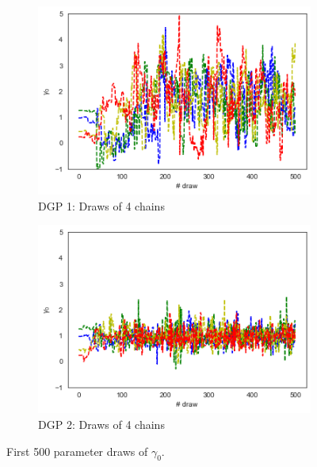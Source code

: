 \begin{figure}[h!]
  \centering
  \begin{subfigure}{0.4\linewidth}
    \includegraphics[width=\linewidth]{graphics/convergence_1}
    \caption{DGP 1: Draws of 4 chains}
  \end{subfigure}
  \begin{subfigure}{0.4\linewidth}
    \includegraphics[width=\linewidth]{graphics/convergence}
    \caption{DGP 2: Draws of 4 chains}
  \end{subfigure}
  \caption{First 500 parameter draws of $\gamma_0$.}
  \label{fig:convergence}
\end{figure}


